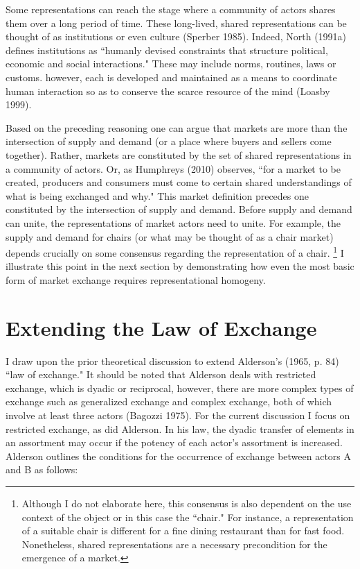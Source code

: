 Some representations can reach the stage where a community of actors shares them over a long period of time. These long-lived, shared representations can be thought of as institutions or even culture (Sperber 1985). Indeed, North (1991a) defines institutions as ``humanly devised constraints that structure political, economic and social interactions."  These may include norms, routines, laws or customs. however, each is developed and maintained as a means to coordinate human interaction so as to conserve the scarce resource of the mind (Loasby 1999). 

Based on the preceding reasoning one can argue that markets are more than the intersection of supply and demand (or a place where buyers and sellers come together).  Rather, markets are constituted by the set of shared representations in a community of actors. Or, as Humphreys (2010) observes, ``for a market to be created, producers and consumers must come to certain shared understandings of what is being exchanged and why." This market definition precedes one constituted by the intersection of supply and demand. Before supply and demand can unite, the representations of market actors need to unite. For example, the supply and demand for chairs (or what may be thought of as a chair market) depends crucially on some consensus regarding the representation of a chair. \footnote{Although I do not elaborate here, this consensus is also dependent on the use context of the object or in this case the ``chair." For instance, a representation of a suitable chair is different for a fine dining restaurant than for fast food. Nonetheless, shared representations are a necessary precondition for the emergence of a market.} I illustrate this point in the next section by demonstrating how even the most basic form of market exchange requires representational homogeny. 

\section{Extending the Law of Exchange}
I draw upon the prior theoretical discussion to extend Alderson's (1965, p. 84) ``law of exchange." It should be noted that Alderson deals with restricted exchange, which is dyadic or reciprocal, however, there are more complex types of exchange such as generalized exchange and complex exchange, both of which involve at least three actors (Bagozzi 1975). For the current discussion I focus on restricted exchange, as did Alderson.  In his law, the dyadic transfer of elements in an assortment may occur if the potency of each actor's assortment is increased. Alderson outlines the conditions for the occurrence of exchange between actors A and B as follows:

